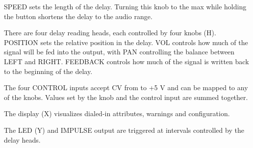 \documentclass[11pt]{article}
\begin{document}
\begin{minipage}[t]{0.55\textwidth}
SPEED sets the length of the delay. Turning this knob to the max while holding
the button shortens the delay to the audio range.

There are four delay reading heads, each controlled by four knobs (H). POSITION
sets the relative position in the delay. VOL controls how much of the signal
will be fed into the output, with PAN controlling the balance between LEFT and
RIGHT. FEEDBACK controls how much of the signal is written back to the beginning
of the delay.

The four CONTROL inputs accept CV from  to +5 V and can be mapped to
any of the knobs. Values set by the knob and the control input are summed
together.

The display (X) visualizes dialed-in attributes, warnings and configuration.

The LED (Y) and IMPULSE output are triggered at intervals controlled by the
delay heads.

\end{minipage}%
\begin{minipage}{0.05\textwidth}
\phantom{ }
\end{minipage}%
\end{document}
